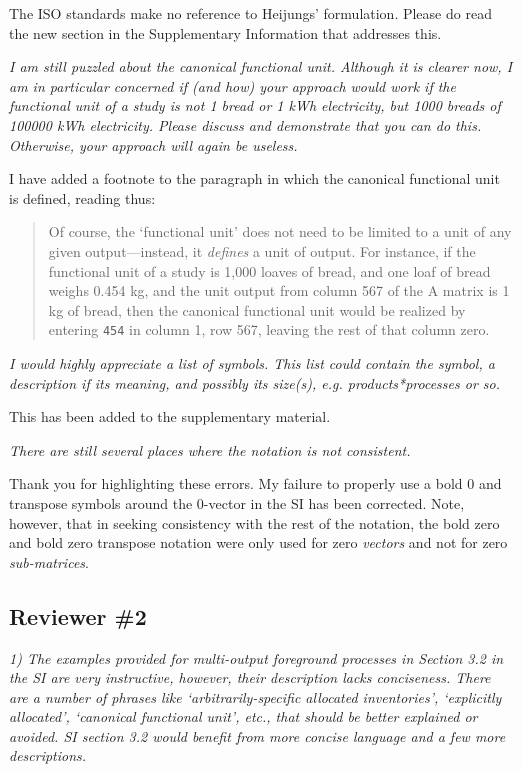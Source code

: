 \documentclass[11pt,letterpaper]{article}
\begin{document}
The ISO standards make no reference to Heijungs' formulation.  Please do read the new section in the Supplementary Information that addresses this.

\emph{I am still puzzled about the canonical functional unit. Although it is clearer now, I am in particular concerned if (and how) your approach would work if the functional unit of a study is not 1 bread or 1 kWh electricity, but 1000 breads of 100000 kWh electricity. Please discuss and demonstrate that you can do this. Otherwise, your approach will again be useless.}

I have added a footnote to the paragraph in which the canonical functional unit is defined, reading thus:
\begin{quote}Of course, the `functional unit' does not need to be limited to a unit of any given output---instead, it \textit{defines} a unit of output. For instance, if the functional unit of a study is 1,000 loaves of bread, and one loaf of bread weighs 0.454 kg, and the unit output from column 567 of the A matrix is 1 kg of bread, then the canonical functional unit would be realized by entering \texttt{454} in column 1, row 567, leaving the rest of that column zero.
\end{quote}

\emph{I would highly appreciate a list of symbols. This list could contain the symbol, a description if its meaning, and possibly its size(s), e.g. products*processes or so.}

This has been added to the supplementary material.

\emph{There are still several places where the notation is not consistent. }

Thank you for highlighting these errors.  My failure to properly use a bold 0 and transpose symbols around the 0-vector in the SI has been corrected.  Note, however, that in seeking consistency with the rest of the notation, the bold zero and bold zero transpose notation were only used for zero \emph{vectors} and not for zero \emph{sub-matrices}.

\subsection*{Reviewer \#2}

\emph{1) The examples provided for multi-output foreground processes in Section 3.2 in the SI are very instructive, however, their description lacks conciseness. There are a number of phrases like ‘arbitrarily-specific allocated inventories’, ‘explicitly allocated’, ‘canonical functional unit’, etc., that should be better explained or avoided. SI section 3.2 would benefit from more concise language and a few more descriptions.}
\end{document}
